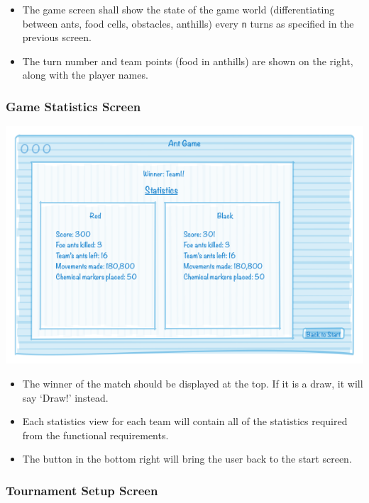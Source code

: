 \documentclass[11pt]{article}
\begin{document}
\begin{itemize}
\item The game screen shall show the state of the game world (differentiating between ants, food cells, obstacles, anthills) every \texttt{n} turns as specified in the previous screen.
\item The turn number and team points (food in anthills) are shown on the right, along with the player names.
\end{itemize}

\subsubsection{Game Statistics Screen}

\begin{center}
\includegraphics[width=\textwidth]{low-level-diagrams/interface/game-statistics-screen}
\end{center}

\begin{itemize}
\item The winner of the match should be displayed at the top. If it is a draw, it will say `Draw!' instead.
\item Each statistics view for each team will contain all of the statistics required from the functional requirements.
\item The button in the bottom right will bring the user back to the start screen.
\end{itemize}

\subsubsection{Tournament Setup Screen}
\end{document}
